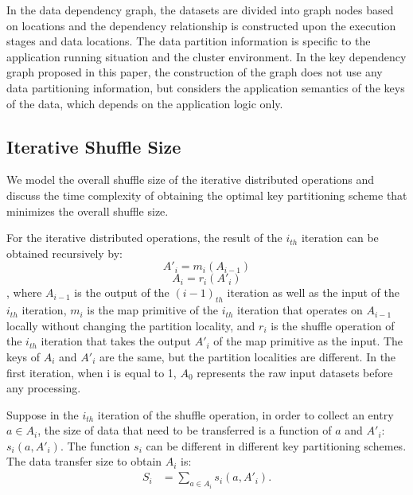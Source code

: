\documentclass[10pt,journal,compsoc]{IEEEtran}
\begin{document}
In the data dependency graph, the datasets are divided into graph nodes
based on locations and the dependency relationship is
constructed upon the execution stages and data locations.
The data partition information is specific to the application running
situation and the cluster environment.
In the key dependency graph proposed in this paper, the construction of
the graph does not use any data partitioning information, but considers
the application semantics of the keys of the data, which depends on the
application logic only.

\subsection{Iterative Shuffle Size}\label{section:model}
We model the overall shuffle size of the iterative
distributed operations and discuss the time complexity of obtaining
the optimal key partitioning scheme that minimizes the overall shuffle
size.



For the iterative distributed operations, the result of the $i_{th}$ iteration can be obtained recursively by:
\begin{equation}\label{eq:m}
A'_i=m_i(A_{i-1})
\end{equation}
\begin{equation}\label{eq:r}
A_i=r_i(A'_i)
\end{equation}
, where $A_{i-1}$ is the output of the $(i-1)_{th}$ iteration as well as the input of the $i_{th}$ iteration, 
$m_i$ is the map primitive of the $i_{th}$ iteration that operates on $A_{i-1}$ locally without changing the partition locality, 
and $r_i$ is the shuffle operation of the $i_{th}$ iteration that takes the output $A'_i$ of the map primitive as the input.  
The keys of $A_i$ and $A'_i$ are the same, but the partition localities are different. 
In the first iteration, when i is equal to 1, 
$A_0$ represents the raw input datasets before any processing.  

Suppose in the $i_{th}$ iteration of the shuffle operation, in order to collect an entry $a \in A_i$, 
the size of data that need to be transferred is a function of $a$ and $A'_i$: $s_i(a,A'_i)$. The function $s_i$ can be different in different key partitioning schemes. 
The data transfer size to obtain $A_i$ is: 
\begin{equation}\label{eq:si}
\begin{aligned}
S_i&=\sum_{a \in A_i} s_i(a,A'_i).
\end{aligned}
\end{equation}
\end{document}
